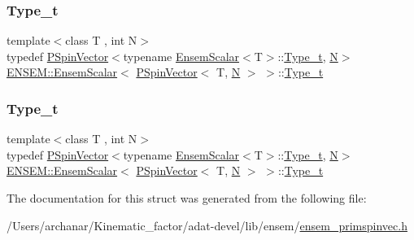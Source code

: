 \subsubsection{\texorpdfstring{Type\_t}{Type\_t}\hspace{0.1cm}{\footnotesize\ttfamily [2/3]}}
{\footnotesize\ttfamily template$<$class T , int N$>$ \\
typedef \mbox{\hyperlink{classENSEM_1_1PSpinVector}{P\+Spin\+Vector}}$<$typename \mbox{\hyperlink{structENSEM_1_1EnsemScalar}{Ensem\+Scalar}}$<$T$>$\+::\mbox{\hyperlink{structENSEM_1_1EnsemScalar_3_01PSpinVector_3_01T_00_01N_01_4_01_4_aef6767dcaa0dee58e84534fb1554dd11}{Type\+\_\+t}}, \mbox{\hyperlink{adat__devel_2lib_2hadron_2operator__name__util_8cc_a7722c8ecbb62d99aee7ce68b1752f337}{N}}$>$ \mbox{\hyperlink{structENSEM_1_1EnsemScalar}{E\+N\+S\+E\+M\+::\+Ensem\+Scalar}}$<$ \mbox{\hyperlink{classENSEM_1_1PSpinVector}{P\+Spin\+Vector}}$<$ T, \mbox{\hyperlink{adat__devel_2lib_2hadron_2operator__name__util_8cc_a7722c8ecbb62d99aee7ce68b1752f337}{N}} $>$ $>$\+::\mbox{\hyperlink{structENSEM_1_1EnsemScalar_3_01PSpinVector_3_01T_00_01N_01_4_01_4_aef6767dcaa0dee58e84534fb1554dd11}{Type\+\_\+t}}}

\mbox{\label{structENSEM_1_1EnsemScalar_3_01PSpinVector_3_01T_00_01N_01_4_01_4_aef6767dcaa0dee58e84534fb1554dd11}} 
\subsubsection{\texorpdfstring{Type\_t}{Type\_t}\hspace{0.1cm}{\footnotesize\ttfamily [3/3]}}
{\footnotesize\ttfamily template$<$class T , int N$>$ \\
typedef \mbox{\hyperlink{classENSEM_1_1PSpinVector}{P\+Spin\+Vector}}$<$typename \mbox{\hyperlink{structENSEM_1_1EnsemScalar}{Ensem\+Scalar}}$<$T$>$\+::\mbox{\hyperlink{structENSEM_1_1EnsemScalar_3_01PSpinVector_3_01T_00_01N_01_4_01_4_aef6767dcaa0dee58e84534fb1554dd11}{Type\+\_\+t}}, \mbox{\hyperlink{adat__devel_2lib_2hadron_2operator__name__util_8cc_a7722c8ecbb62d99aee7ce68b1752f337}{N}}$>$ \mbox{\hyperlink{structENSEM_1_1EnsemScalar}{E\+N\+S\+E\+M\+::\+Ensem\+Scalar}}$<$ \mbox{\hyperlink{classENSEM_1_1PSpinVector}{P\+Spin\+Vector}}$<$ T, \mbox{\hyperlink{adat__devel_2lib_2hadron_2operator__name__util_8cc_a7722c8ecbb62d99aee7ce68b1752f337}{N}} $>$ $>$\+::\mbox{\hyperlink{structENSEM_1_1EnsemScalar_3_01PSpinVector_3_01T_00_01N_01_4_01_4_aef6767dcaa0dee58e84534fb1554dd11}{Type\+\_\+t}}}



The documentation for this struct was generated from the following file\+:\begin{DoxyCompactItemize}
\item 
/\+Users/archanar/\+Kinematic\+\_\+factor/adat-\/devel/lib/ensem/\mbox{\hyperlink{adat-devel_2lib_2ensem_2ensem__primspinvec_8h}{ensem\+\_\+primspinvec.\+h}}\end{DoxyCompactItemize}
